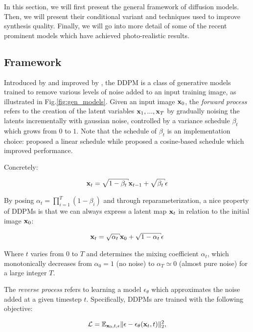 In this section, we will first present the general framework of diffusion models. Then, we will 
present their conditional variant and techniques used to improve synthesis quality. Finally, 
we will go into more detail of some of the recent prominent models which have achieved photo-realistic 
results.

\subsection{Framework}

Introduced by \cite{sohl2015deep} and improved by \cite{ho2020denoising}, the \ac{DDPM} is a class 
of generative models trained to remove various levels of noise added to an input training image, as illustrated in Fig.\ref{fig:gen_models}.
Given an input image $\mathbf{x}_0$, the \emph{forward process} refers to the creation of the latent variables 
$\mathbf{x}_1, ..., \mathbf{x}_T$ by gradually noising the latents incrementally with gaussian noise, controlled by 
a variance schedule ${\beta_t}$ which grows from $0$ to $1$. Note that the schedule of 
$\beta_t$ is an implementation choice: \cite{ho2020denoising} proposed a linear schedule while 
\cite{dhariwal2021diffusion} proposed a cosine-based schedule which improved performance.

Concretely:

\begin{equation}
      \x_t = \sqrt{1 - \beta_t} \x_{t-1} +  \sqrt{\beta_t} \epsilon
\end{equation}

By posing $\alpha_t = \prod_{i=1}^{T} (1 - \beta_i)$ and through reparameterization, 
a nice property of \ac{DDPM}s is that we can always express a latent map $\mathbf{x}_t$ in relation 
to the initial image $\mathbf{x}_0$:

\begin{equation}
      \x_t = \sqrt{\alpha_t} \x_0 +  \sqrt{1 - \alpha_t} \epsilon
\end{equation}

Where $t$ varies from $0$ to $T$ and determines the mixing coefficient $\alpha_t$, which monotonically 
decreases from  $\alpha_0 = 1$ (no noise) to $\alpha_T \simeq 0$ (almost pure noise) for a large integer $T$.


The \emph{reverse process} refers to learning a model  $\epsilon_\theta$  which approximates the noise added at a given 
timestep $t$. Specifically, \ac{DDPM}s are trained with the following objective:

\begin{equation}
      \mathcal{L} = \displaystyle \mathbb{E}_{\mathbf{x}_0, t, \epsilon} \Vert \epsilon - \epsilon_\theta(\mathbf{x}_t, t) \Vert_2^2,
\end{equation}


